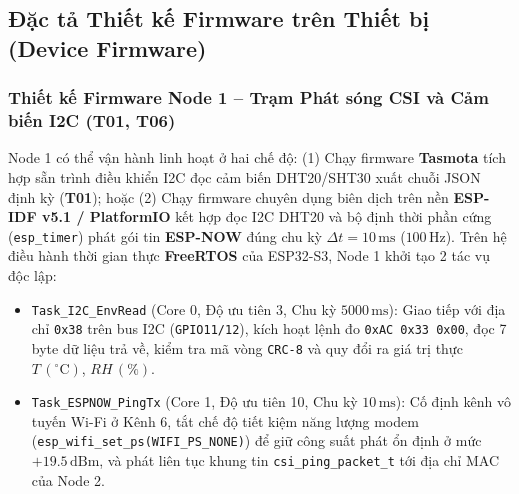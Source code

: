 \documentclass{hcmut-report}
\begin{document}
\subsection[Đặc tả Thiết kế Firmware trên Thiết bị]{Đặc tả Thiết kế Firmware trên Thiết bị (Device Firmware)}

\subsubsection[Firmware Node 1 -- Trạm Phát CSI và I2C (T01, T06)]{Thiết kế Firmware Node 1 -- Trạm Phát sóng CSI và Cảm biến I2C (T01, T06)}
Node 1 có thể vận hành linh hoạt ở hai chế độ: (1) Chạy firmware \textbf{Tasmota} tích hợp sẵn trình điều khiển I2C đọc cảm biến DHT20/SHT30 xuất chuỗi JSON định kỳ (\textbf{T01}); hoặc (2) Chạy firmware chuyên dụng biên dịch trên nền \textbf{ESP-IDF v5.1 / PlatformIO} kết hợp đọc I2C DHT20 và bộ định thời phần cứng (\texttt{esp\_timer}) phát gói tin \textbf{ESP-NOW} đúng chu kỳ $\Delta t = 10\,\text{ms}$ ($100\,\text{Hz}$). Trên hệ điều hành thời gian thực \textbf{FreeRTOS} của ESP32-S3, Node 1 khởi tạo 2 tác vụ độc lập:
\begin{itemize}
  \item \texttt{Task\_I2C\_EnvRead} (Core 0, Độ ưu tiên 3, Chu kỳ $5000\,\text{ms}$): Giao tiếp với địa chỉ \texttt{0x38} trên bus I2C (\texttt{GPIO11/12}), kích hoạt lệnh đo \texttt{0xAC 0x33 0x00}, đọc 7 byte dữ liệu trả về, kiểm tra mã vòng \texttt{CRC-8} và quy đổi ra giá trị thực $T\,(^\circ\text{C})$, $RH\,(\%)$.
  \item \texttt{Task\_ESPNOW\_PingTx} (Core 1, Độ ưu tiên 10, Chu kỳ $10\,\text{ms}$): Cố định kênh vô tuyến Wi-Fi ở Kênh 6, tắt chế độ tiết kiệm năng lượng modem (\texttt{esp\_wifi\_set\_ps(WIFI\_PS\_NONE)}) để giữ công suất phát ổn định ở mức $+19.5\,\text{dBm}$, và phát liên tục khung tin \texttt{csi\_ping\_packet\_t} tới địa chỉ MAC của Node 2.
\end{itemize}
\end{document}
